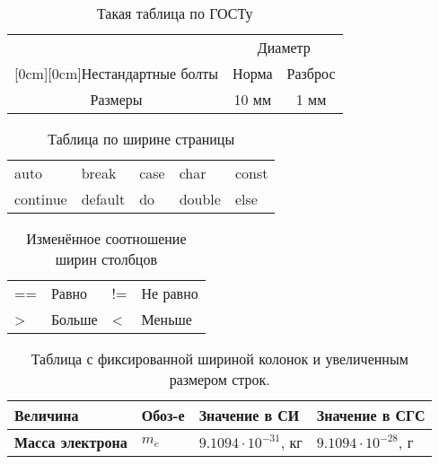 \begin{table}[H]
		\caption{Такая таблица по ГОСТу}
		\label{tab:GOST2}
	\begin{center}
		\begin{tabular}{|c|c|c|}
			\hline
			& \multicolumn{2}{c|}{Диаметр} \\
			\cline{2-3}
			\raisebox{1.5ex}[0cm][0cm]{Нестандартные болты}
			& Норма & Разброс \\
			\hline
			Размеры & 10 мм & 1 мм \\
			\hline
		\end{tabular}
	\end{center}
\end{table}

\begin{table}[htbp]
	\caption{Таблица по ширине страницы}
	\begin{tabularx}{\textwidth}{XXXXX}
		\toprule
		auto & break & case & char & const\\
		continue   & default   & do & double & else\\
		\bottomrule
	\end{tabularx}
\end{table}

\begin{table}[htbp]
	\centering
	\caption{Изменённое соотношение ширин столбцов}
	\begin{tabularx}{.85\textwidth}{>{\hsize=0.075\textwidth}XX>{\hsize=0.075\textwidth}XX}
		\toprule
		== & Равно & != & Не равно\\
		> & Больше & < & Меньше\\
		\bottomrule
	\end{tabularx}
\end{table}


\begin{table}[!hbt]
		\caption{Таблица с фиксированной шириной колонок и увеличенным размером строк.}
	\begin{center}
		\renewcommand{\arraystretch}{1.2} %
		\begin{tabular}{|>{\raggedright\arraybackslash}m{3.2cm}|>{\arraybackslash}p{1.9cm}|>{\raggedright\arraybackslash}m{5cm}|>{\raggedright\arraybackslash}m{5cm}|}
			\hline
			\textbf{Величина} & \textbf{Обоз-е} & \textbf{Значение в СИ} & \textbf{Значение в СГС} \\
			\hline
			\textbf{Масса электрона} & $m_e$ &$9.1094\cdot10^{-31}$, кг  & $9.1094\cdot10^{-28}$, г  \\
			\hline
			
		\end{tabular}
	\end{center}
\end{table}	